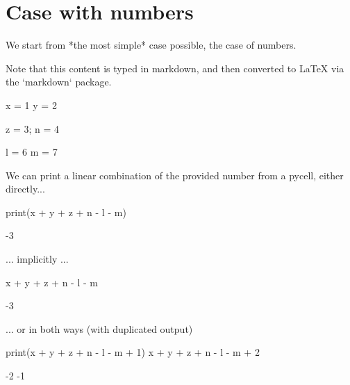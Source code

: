 \documentclass[oneside]{book}
\begin{document}
\chapter{Case with numbers}

\begin{mdcell}
We start from *the most simple* case possible, the case of numbers.

Note that this content is typed in markdown, and then converted to LaTeX via the `markdown` package.
\end{mdcell}

\begin{pycell}
x = 1
y = 2
\end{pycell}

\begin{pycell}
z = 3; n = 4
\end{pycell}

\begin{pycell}
l = 6
m = 7
\end{pycell}

\begin{mdcell}
We can print a linear combination of the provided number from a pycell, either directly...
\end{mdcell}

\begin{pycell}
print(x + y + z + n - l - m)
\end{pycell}
\begin{pyexpectedoutput}
-3
\end{pyexpectedoutput}

\begin{mdcell}
... implicitly ...
\end{mdcell}

\begin{pycell}
x + y + z + n - l - m
\end{pycell}
\begin{pyexpectedoutput}
-3
\end{pyexpectedoutput}

\begin{mdcell}
... or in both ways (with duplicated output)
\end{mdcell}

\begin{pycell}
print(x + y + z + n - l - m + 1)
x + y + z + n - l - m + 2
\end{pycell}
\begin{pyexpectedoutput}
-2
-1
\end{pyexpectedoutput}
\end{document}
